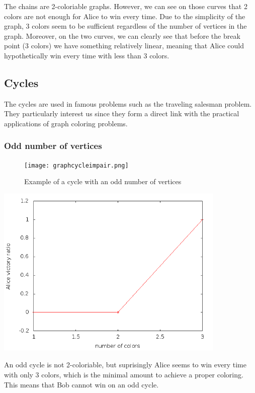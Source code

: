 The chains are 2-coloriable graphs. However, we can see on those curves that 2 colors are not enough for Alice to win every time. Due to the simplicity of the graph, 3 colors seem to be sufficient regardless of the number of vertices in the graph. Moreover, on the two curves, we can clearly see that before the break point (3 colors) we have something relatively linear, meaning that Alice could hypothetically win every time with less than 3 colors.

\subsection{Cycles}

The cycles are used in famous problems such as the traveling salesman problem. They particularly interest us since they form a direct link with the practical applications of graph coloring problems.

\subsubsection{Odd number of vertices}

\begin{figure}[h]
\begin{center}  
	\texttt{[image: graphcycleimpair.png]}
\end{center}
    \caption{Example of a cycle with an odd number of vertices}
    \label{cycleimpaire}
\end{figure}

\includegraphics[width=11cm]{resultats/cycleimpair.png}

An odd cycle is not 2-coloriable, but suprisingly Alice seems to win every time with only 3 colors, which is the minimal amount to achieve a proper coloring. This means that Bob cannot win on an odd cycle.

